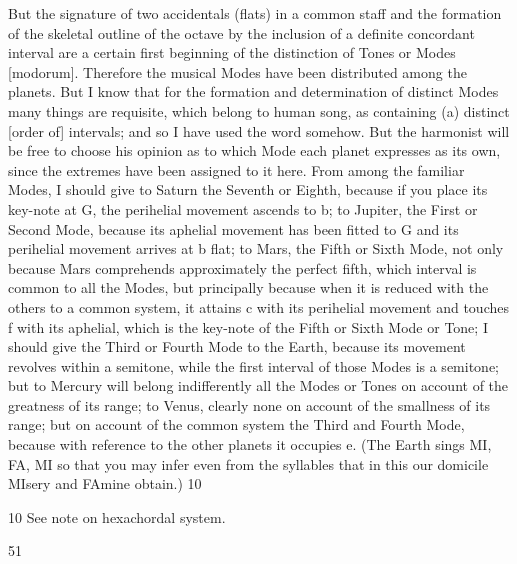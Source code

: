 \documentclass{article}
\begin{document}
But the signature of two accidentals (flats) in a common staff and the
formation of the skeletal outline of the octave by the inclusion of a
definite concordant interval are a certain first beginning of the
distinction of Tones or Modes [modorum]. Therefore the musical Modes
have been distributed among the planets. But I know that for the
formation and determination of distinct Modes many things are
requisite, which belong to human song, as containing (a) distinct [order
of] intervals; and so I have used the word somehow.
But the harmonist will be free to choose his opinion as to which Mode
each planet expresses as its own, since the extremes have been assigned
to it here. From among the familiar Modes, I should give to Saturn the
Seventh or Eighth, because if you place its key-note at G, the perihelial
movement ascends to b; to Jupiter, the First or Second Mode, because its
aphelial movement has been fitted to G and its perihelial movement
arrives at b flat; to Mars, the Fifth or Sixth Mode, not only because Mars
comprehends approximately the perfect fifth, which interval is common
to all the Modes, but principally because when it is reduced with the
others to a common system, it attains c with its perihelial movement and
touches f with its aphelial, which is the key-note of the Fifth or Sixth
Mode or Tone; I should give the Third or Fourth Mode to the Earth,
because its movement revolves within a semitone, while the first interval
of those Modes is a semitone; but to Mercury will belong indifferently all
the Modes or Tones on account of the greatness of its range; to Venus,
clearly none on account of the smallness of its range; but on account of
the common system the Third and Fourth Mode, because with reference
to the other planets it occupies e. (The Earth sings MI, FA, MI so that
you may infer even from the syllables that in this our domicile MIsery
and FAmine obtain.) 10

10 See note on hexachordal system.


51
\end{document}
